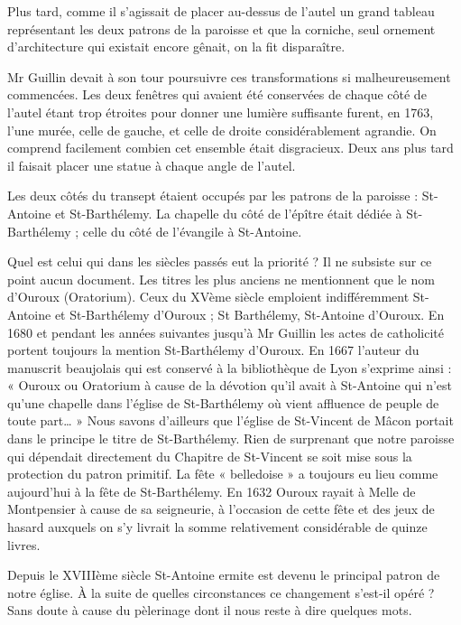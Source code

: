 Plus tard, comme il s'agissait de placer au-dessus de l'autel un grand tableau représentant les deux patrons de la paroisse et que la corniche, seul ornement d'architecture qui existait encore gênait, on la fit disparaître.

Mr Guillin devait à son tour poursuivre ces transformations si malheureusement commencées. Les deux fenêtres qui avaient été conservées de chaque côté de l'autel étant trop étroites pour donner une lumière suffisante furent, en 1763, l'une murée, celle de gauche, et celle de droite considérablement agrandie. On comprend facilement combien cet ensemble était disgracieux. Deux ans plus tard il faisait placer une statue à chaque angle de l'autel.

Les deux côtés du transept étaient occupés par les patrons de la paroisse : St-Antoine et St-Barthélemy. La chapelle du côté de l'épître était dédiée à St-Barthélemy ; celle du côté de l'évangile à St-Antoine.

Quel est celui qui dans les siècles passés eut la priorité ? Il ne subsiste sur ce point aucun document. Les titres les plus anciens ne mentionnent que le nom d'Ouroux (Oratorium). Ceux du XVème siècle emploient indifféremment St-Antoine et St-Barthélemy d'Ouroux ; St
Barthélemy, St-Antoine d'Ouroux. En 1680 et pendant les années suivantes jusqu'à Mr Guillin les actes de catholicité portent toujours la mention St-Barthélemy d'Ouroux. En 1667 l'auteur du manuscrit beaujolais qui est conservé à la bibliothèque de Lyon s'exprime ainsi : « Ouroux ou Oratorium à cause de la dévotion qu'il avait à St-Antoine qui n'est qu'une chapelle dans l'église de St-Barthélemy où vient affluence de peuple de toute part… » Nous savons d'ailleurs que l'église de St-Vincent de Mâcon portait dans le principe le titre de St-Barthélemy. Rien de surprenant que notre paroisse qui dépendait directement du Chapitre de St-Vincent se soit mise sous la protection du patron primitif. La fête « belledoise » a toujours eu lieu comme aujourd'hui à la fête de St-Barthélemy. En 1632 Ouroux rayait à Melle de Montpensier à cause de sa seigneurie, à l'occasion de cette fête et des jeux de hasard auxquels on s'y livrait la somme relativement considérable de quinze livres.

Depuis le XVIIIème siècle St-Antoine ermite est devenu le principal patron de notre église. À la suite de quelles circonstances ce changement s'est-il opéré ? Sans doute à cause du pèlerinage dont il nous reste à dire quelques mots.

